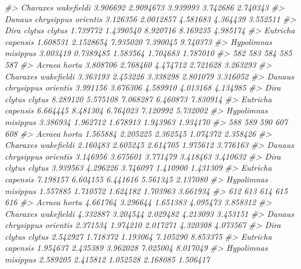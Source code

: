 \documentclass[
]{article}
\newenvironment{Shaded}{\begin{snugshade}}{\end{snugshade}}
\newcommand{\CommentTok}[1]{\textcolor[rgb]{0.56,0.35,0.01}{\textit{#1}}}
\begin{document}
\begin{Shaded}
\begin{Highlighting}[]
\CommentTok{\#\textgreater{} Charaxes wakefieldi        3.906692 2.9094673 3.939993 3.742686 2.740343}
\CommentTok{\#\textgreater{} Danaus chrysippus orientis 3.126356 2.0012857 4.581683 4.364439 3.552511}
\CommentTok{\#\textgreater{} Dira clytus clytus         1.739772 1.4390540 8.920716 8.169235 4.985174}
\CommentTok{\#\textgreater{} Eutricha capensis          1.608531 2.1528654 7.935020 7.390045 9.740373}
\CommentTok{\#\textgreater{} Hypolimnas misippus        3.003419 0.7389485 1.583564 1.704683 1.787010}
\CommentTok{\#\textgreater{}                                 582      583      584      585      587}
\CommentTok{\#\textgreater{} Acraea horta               3.808706 2.768460 4.474712 2.721628 3.263293}
\CommentTok{\#\textgreater{} Charaxes wakefieldi        3.363193 2.453226 3.338298 2.801079 3.316052}
\CommentTok{\#\textgreater{} Danaus chrysippus orientis 3.991156 3.676306 4.589910 4.013168 4.134985}
\CommentTok{\#\textgreater{} Dira clytus clytus         8.289120 5.575108 7.068287 6.460873 7.830914}
\CommentTok{\#\textgreater{} Eutricha capensis          6.664445 8.481304 6.764023 7.120992 5.732002}
\CommentTok{\#\textgreater{} Hypolimnas misippus        3.386934 1.962712 1.678913 1.943963 1.934170}
\CommentTok{\#\textgreater{}                                 588      589      590      607      608}
\CommentTok{\#\textgreater{} Acraea horta               1.565884 2.205225 2.362545 1.074372 2.358426}
\CommentTok{\#\textgreater{} Charaxes wakefieldi        2.160483 2.605245 2.614705 1.975612 3.776163}
\CommentTok{\#\textgreater{} Danaus chrysippus orientis 3.146956 3.675601 3.771479 3.418463 3.410632}
\CommentTok{\#\textgreater{} Dira clytus clytus         3.939563 4.296226 3.746097 1.410900 1.431309}
\CommentTok{\#\textgreater{} Eutricha capensis          7.198157 6.604155 6.441616 5.561345 2.137080}
\CommentTok{\#\textgreater{} Hypolimnas misippus        1.557885 1.710572 1.624182 1.703963 3.661934}
\CommentTok{\#\textgreater{}                                 612      613      614      615      616}
\CommentTok{\#\textgreater{} Acraea horta               4.661764 3.296644 1.651383 4.095473 3.858312}
\CommentTok{\#\textgreater{} Charaxes wakefieldi        4.332887 3.204544 2.029482 4.213093 3.453151}
\CommentTok{\#\textgreater{} Danaus chrysippus orientis 2.371534 1.974210 2.017271 4.320308 4.073567}
\CommentTok{\#\textgreater{} Dira clytus clytus         2.542927 1.718372 1.193064 7.105290 8.853375}
\CommentTok{\#\textgreater{} Eutricha capensis          1.954637 2.435389 3.962028 7.025004 8.017049}
\CommentTok{\#\textgreater{} Hypolimnas misippus        2.589205 2.415812 1.052528 2.168085 1.506417}

\end{Highlighting}
\end{Shaded}
\end{document}
